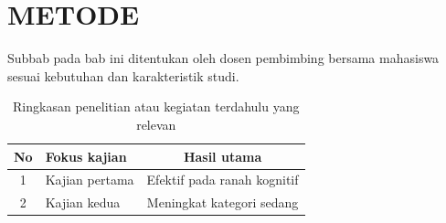 \chapter{METODE}
Subbab pada bab ini ditentukan oleh dosen pembimbing bersama mahasiswa sesuai kebutuhan dan
karakteristik studi.

\begin{table}[htbp]
  \centering
  \caption{Ringkasan penelitian atau kegiatan terdahulu yang relevan}
  \label{tab:terdahulu}
  \begin{tabular}{clc}
    \toprule
    No & Fokus kajian & Hasil utama \\
    \midrule
    1 & Kajian pertama \citep{martin2014write} & Efektif pada ranah kognitif \\
    2 & Kajian kedua \citep{geraldi2017project} & Meningkat kategori sedang \\
    \bottomrule
  \end{tabular}
\end{table}
